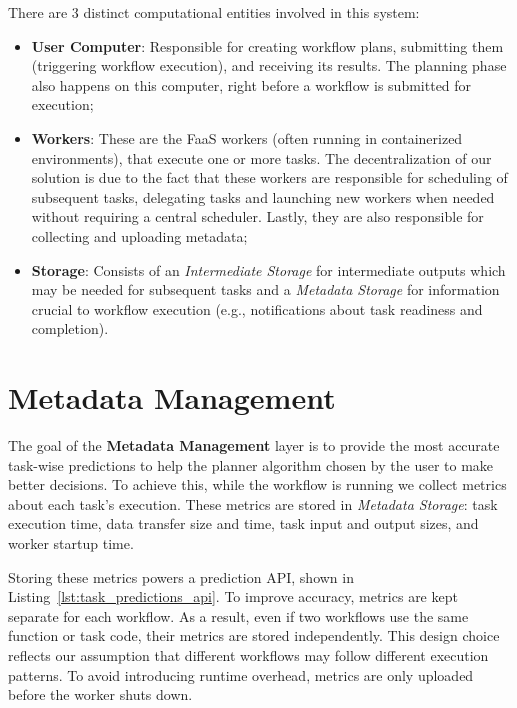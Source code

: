 There are 3 distinct computational entities involved in this system:

\begin{itemize}
    \item \textbf{User Computer}: Responsible for creating workflow plans, submitting them (triggering workflow execution), and receiving its results. The planning phase also happens on this computer, right before a workflow is submitted for execution;
    \item \textbf{Workers}: These are the FaaS workers (often running in containerized environments), that execute one or more tasks. The decentralization of our solution is due to the fact that these workers are responsible for scheduling of subsequent tasks, delegating tasks and launching new workers when needed without requiring a central scheduler. Lastly, they are also responsible for collecting and uploading metadata;
    \item \textbf{Storage}: Consists of an \textit{Intermediate Storage} for intermediate outputs which may be needed for subsequent tasks and a \textit{Metadata Storage} for information crucial to workflow execution (e.g., notifications about task readiness and completion).
\end{itemize}

\section{Metadata Management}
\label{s:metadata_management}
The goal of the \textbf{Metadata Management} layer is to provide the most accurate task-wise predictions to help the planner algorithm chosen by the user to make better decisions. To achieve this, while the workflow is running we collect metrics about each task's execution. These metrics are stored in \textit{Metadata Storage}: task execution time, data transfer size and time, task input and output sizes, and worker startup time. 

Storing these metrics powers a prediction API, shown in Listing~\ref{lst:task_predictions_api}. To improve accuracy, metrics are kept separate for each workflow. As a result, even if two workflows use the same function or task code, their metrics are stored independently. This design choice reflects our assumption that different workflows may follow different execution patterns. To avoid introducing runtime overhead, metrics are only uploaded before the worker shuts down.

